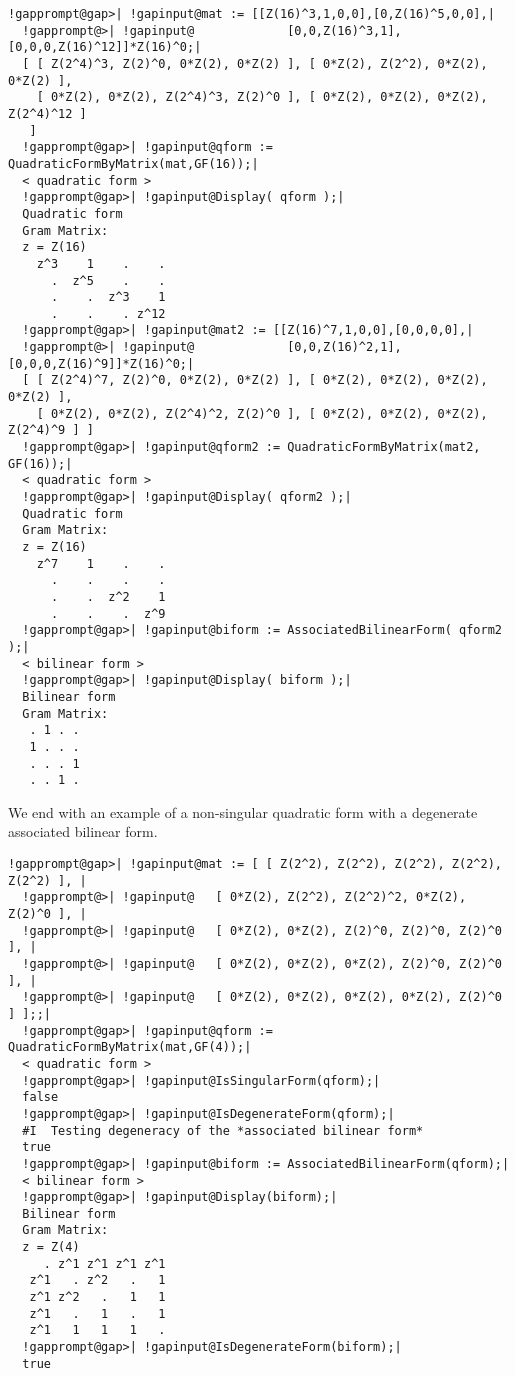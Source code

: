 \documentclass[a4paper,11pt]{report}
\begin{document}
{{{\begin{Verbatim}[commandchars=!@|,fontsize=\small,frame=single,label=Example]
  !gapprompt@gap>| !gapinput@mat := [[Z(16)^3,1,0,0],[0,Z(16)^5,0,0],|
  !gapprompt@>| !gapinput@             [0,0,Z(16)^3,1],[0,0,0,Z(16)^12]]*Z(16)^0;|
  [ [ Z(2^4)^3, Z(2)^0, 0*Z(2), 0*Z(2) ], [ 0*Z(2), Z(2^2), 0*Z(2), 0*Z(2) ], 
    [ 0*Z(2), 0*Z(2), Z(2^4)^3, Z(2)^0 ], [ 0*Z(2), 0*Z(2), 0*Z(2), Z(2^4)^12 ] 
   ]
  !gapprompt@gap>| !gapinput@qform := QuadraticFormByMatrix(mat,GF(16));|
  < quadratic form >
  !gapprompt@gap>| !gapinput@Display( qform );|
  Quadratic form
  Gram Matrix:
  z = Z(16)
    z^3    1    .    .
      .  z^5    .    .
      .    .  z^3    1
      .    .    . z^12
  !gapprompt@gap>| !gapinput@mat2 := [[Z(16)^7,1,0,0],[0,0,0,0],|
  !gapprompt@>| !gapinput@             [0,0,Z(16)^2,1],[0,0,0,Z(16)^9]]*Z(16)^0;|
  [ [ Z(2^4)^7, Z(2)^0, 0*Z(2), 0*Z(2) ], [ 0*Z(2), 0*Z(2), 0*Z(2), 0*Z(2) ], 
    [ 0*Z(2), 0*Z(2), Z(2^4)^2, Z(2)^0 ], [ 0*Z(2), 0*Z(2), 0*Z(2), Z(2^4)^9 ] ]
  !gapprompt@gap>| !gapinput@qform2 := QuadraticFormByMatrix(mat2, GF(16));|
  < quadratic form >
  !gapprompt@gap>| !gapinput@Display( qform2 );|
  Quadratic form
  Gram Matrix:
  z = Z(16)
    z^7    1    .    .
      .    .    .    .
      .    .  z^2    1
      .    .    .  z^9
  !gapprompt@gap>| !gapinput@biform := AssociatedBilinearForm( qform2 );|
  < bilinear form >
  !gapprompt@gap>| !gapinput@Display( biform );|
  Bilinear form
  Gram Matrix:
   . 1 . .
   1 . . .
   . . . 1
   . . 1 . 
\end{Verbatim}
 We end with an example of a non-singular quadratic form with a degenerate
associated bilinear form. 
\begin{Verbatim}[commandchars=!@|,fontsize=\small,frame=single,label=Example]
  !gapprompt@gap>| !gapinput@mat := [ [ Z(2^2), Z(2^2), Z(2^2), Z(2^2), Z(2^2) ], |
  !gapprompt@>| !gapinput@   [ 0*Z(2), Z(2^2), Z(2^2)^2, 0*Z(2), Z(2)^0 ], |
  !gapprompt@>| !gapinput@   [ 0*Z(2), 0*Z(2), Z(2)^0, Z(2)^0, Z(2)^0 ], |
  !gapprompt@>| !gapinput@   [ 0*Z(2), 0*Z(2), 0*Z(2), Z(2)^0, Z(2)^0 ], |
  !gapprompt@>| !gapinput@   [ 0*Z(2), 0*Z(2), 0*Z(2), 0*Z(2), Z(2)^0 ] ];;|
  !gapprompt@gap>| !gapinput@qform := QuadraticFormByMatrix(mat,GF(4));|
  < quadratic form >
  !gapprompt@gap>| !gapinput@IsSingularForm(qform);|
  false
  !gapprompt@gap>| !gapinput@IsDegenerateForm(qform);|
  #I  Testing degeneracy of the *associated bilinear form*
  true
  !gapprompt@gap>| !gapinput@biform := AssociatedBilinearForm(qform);|
  < bilinear form >
  !gapprompt@gap>| !gapinput@Display(biform);|
  Bilinear form
  Gram Matrix:
  z = Z(4)
     . z^1 z^1 z^1 z^1
   z^1   . z^2   .   1
   z^1 z^2   .   1   1
   z^1   .   1   .   1
   z^1   1   1   1   .
  !gapprompt@gap>| !gapinput@IsDegenerateForm(biform);|
  true 
\end{Verbatim}
 }

 }

 }
\end{document}
